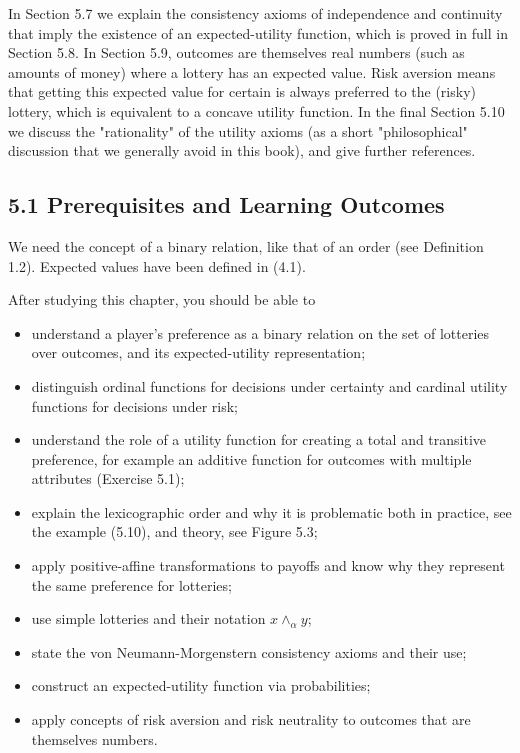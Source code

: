 \documentclass[12pt]{article}
\begin{document}
In Section 5.7 we explain the consistency axioms of independence and continuity that imply the existence of an expected-utility function, which is proved in full in Section 5.8. In Section 5.9, outcomes are themselves real numbers (such as amounts of money) where a lottery has an expected value. Risk aversion means that getting this expected value for certain is always preferred to the (risky) lottery, which is equivalent to a concave utility function. In the final Section 5.10 we discuss the "rationality" of the utility axioms (as a short "philosophical" discussion that we generally avoid in this book), and give further references.

\subsection*{5.1 Prerequisites and Learning Outcomes}
We need the concept of a binary relation, like that of an order (see Definition 1.2). Expected values have been defined in (4.1).

After studying this chapter, you should be able to

\begin{itemize}
  \item understand a player's preference as a binary relation on the set of lotteries over outcomes, and its expected-utility representation;
  \item distinguish ordinal functions for decisions under certainty and cardinal utility functions for decisions under risk;
  \item understand the role of a utility function for creating a total and transitive preference, for example an additive function for outcomes with multiple attributes (Exercise 5.1);
  \item explain the lexicographic order and why it is problematic both in practice, see the example (5.10), and theory, see Figure 5.3;
  \item apply positive-affine transformations to payoffs and know why they represent the same preference for lotteries;
  \item use simple lotteries and their notation $x \wedge_{\alpha} y$;
  \item state the von Neumann-Morgenstern consistency axioms and their use;
  \item construct an expected-utility function via probabilities;
  \item apply concepts of risk aversion and risk neutrality to outcomes that are themselves numbers.
\end{itemize}
\end{document}
